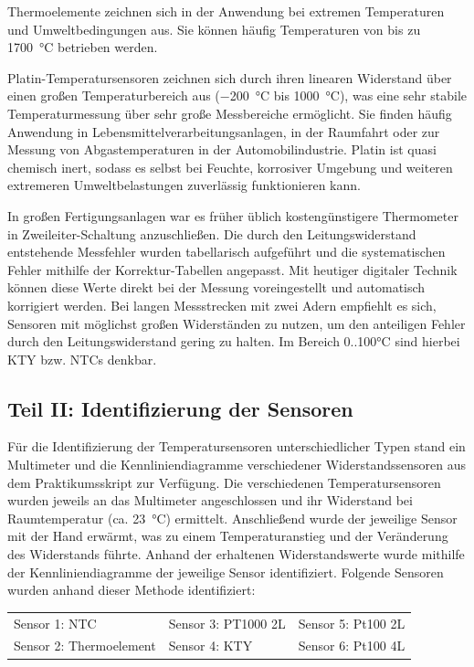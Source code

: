 Thermoelemente zeichnen sich in der Anwendung bei extremen Temperaturen und Umweltbedingungen aus. Sie können häufig Temperaturen von bis zu \SI{1700}{\celsius} betrieben werden.\cite{quelle.2020} 

Platin-Temperatursensoren zeichnen sich durch ihren linearen Widerstand über einen großen Temperaturbereich aus (\SI{-200}{\celsius} bis \SI{1000}{\celsius}), was eine sehr stabile Temperaturmessung über sehr große Messbereiche ermöglicht. Sie finden häufig Anwendung in Lebensmittelverarbeitungsanlagen, in der Raumfahrt oder zur Messung von Abgastemperaturen in der Automobilindustrie. Platin ist quasi chemisch inert, sodass es selbst bei Feuchte, korrosiver Umgebung und weiteren extremeren Umweltbelastungen zuverlässig funktionieren kann.\cite{quelle.2020}

In großen Fertigungsanlagen war es früher üblich kostengünstigere Thermometer in Zweileiter-Schaltung anzuschließen. Die durch den Leitungswiderstand entstehende Messfehler wurden tabellarisch aufgeführt und die systematischen Fehler mithilfe der Korrektur-Tabellen angepasst. Mit heutiger digitaler Technik können diese Werte direkt bei der Messung voreingestellt und automatisch korrigiert werden. 
Bei langen Messstrecken mit zwei Adern empfiehlt es sich, Sensoren mit möglichst großen Widerständen zu nutzen, um den anteiligen Fehler durch den Leitungswiderstand gering zu halten. Im Bereich 0..100\si{\celsius} sind hierbei KTY bzw. NTCs denkbar.
\subsection{Teil II: Identifizierung der Sensoren}

Für die Identifizierung der Temperatursensoren unterschiedlicher Typen stand ein Multimeter und die Kennliniendiagramme verschiedener Widerstandssensoren aus dem Praktikumsskript zur Verfügung. Die verschiedenen Temperatursensoren wurden jeweils an das Multimeter angeschlossen und ihr Widerstand bei Raumtemperatur (ca. \SI{23}{\celsius}) ermittelt. Anschließend wurde der jeweilige Sensor mit der Hand erwärmt, was zu einem Temperaturanstieg und der Veränderung des Widerstands führte. Anhand der erhaltenen Widerstandswerte wurde mithilfe der Kennliniendiagramme der jeweilige Sensor identifiziert. 
Folgende Sensoren wurden anhand dieser Methode identifiziert:

\begin{table}[H]
	\begin{tabular}{lll}
		Sensor 1: NTC           & Sensor 3: PT1000 2L & Sensor 5: Pt100 2L \\
		Sensor 2: Thermoelement & Sensor 4: KTY    & Sensor 6: Pt100 4L \\
	\end{tabular}
\end{table}

